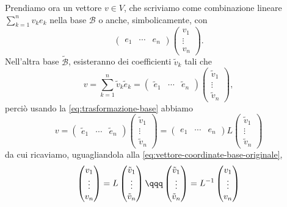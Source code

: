 Prendiamo ora un vettore $v\in V$, che scriviamo come combinazione lineare $\sum_{k=1}^nv_ke_k$ nella base $\mathcal B$ o anche, simbolicamente, con
\begin{equation}
	\begin{pmatrix}
		e_1&\cdots&e_n
	\end{pmatrix}
	\begin{pmatrix}
		v_1\\
		\vdots\\
		v_n
	\end{pmatrix}.
	\label{eq:vettore-coordinate-base-originale}
\end{equation}
Nell'altra base $\tilde{\mathcal B}$, esisteranno dei coefficienti $\tilde v_k$ tali che
\begin{equation}
	v=\sum_{k=1}^n\tilde v_k\tilde e_k=
	\begin{pmatrix}
		\tilde e_1&\cdots&\tilde e_n
	\end{pmatrix}
	\begin{pmatrix}
		\tilde v_1\\
		\vdots\\
		\tilde v_n
	\end{pmatrix},
\end{equation}
perciò usando la \eqref{eq:trasformazione-base} abbiamo
\begin{equation}
	v=
	\begin{pmatrix}
		\tilde e_1&\cdots&\tilde e_n
	\end{pmatrix}
	\begin{pmatrix}
		\tilde v_1\\
		\vdots\\
		\tilde v_n
	\end{pmatrix}=
	\begin{pmatrix}
		e_1&\cdots&e_n
	\end{pmatrix}
	L
	\begin{pmatrix}
		\tilde v_1\\
		\vdots\\
		\tilde v_n
	\end{pmatrix}
\end{equation}
da cui ricaviamo, uguagliandola alla \eqref{eq:vettore-coordinate-base-originale},
\begin{equation}
	\begin{pmatrix}
		v_1\\
		\vdots\\
		v_n
	\end{pmatrix}
	=L
	\begin{pmatrix}
		\tilde v_1\\
		\vdots\\
		\tilde v_n
	\end{pmatrix}
	\qqq
	\begin{pmatrix}
		\tilde v_1\\
		\vdots\\
		\tilde v_n
	\end{pmatrix}
	=L^{-1}
	\begin{pmatrix}
		v_1\\
		\vdots\\
		v_n
	\end{pmatrix}
	\label{eq:cambiamento-base-vettori-coordinate}
\end{equation}
